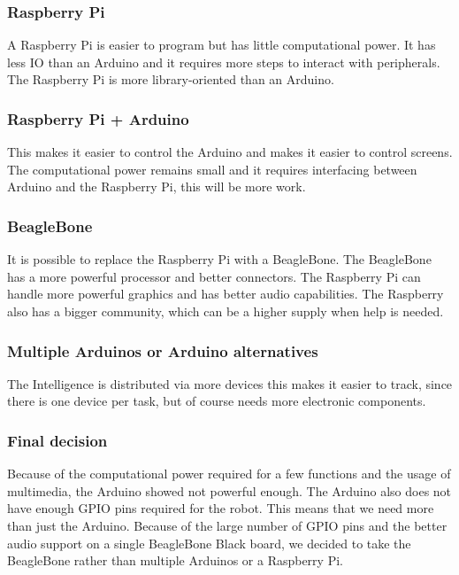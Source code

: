 \documentclass[11pt,twoside,a4paper]{report}
\begin{document}
\subsubsection{Raspberry Pi}
A Raspberry Pi is easier to program but has little computational power. It has less IO than an Arduino and it requires more steps to interact with peripherals. The Raspberry Pi is more library-oriented than an Arduino.
\subsubsection{Raspberry Pi + Arduino}
This makes it easier to control the Arduino and makes it easier to control screens. The computational power remains small and it requires interfacing between Arduino and the Raspberry Pi, this will be more work. 
\subsubsection{BeagleBone}
It is possible to replace the Raspberry Pi with a BeagleBone. The BeagleBone has a more powerful processor and better connectors. The Raspberry Pi can handle more powerful graphics and has better audio capabilities. The Raspberry also has a bigger community, which can be a higher supply when help is needed. 
\subsubsection{Multiple Arduinos or Arduino alternatives}
The Intelligence is distributed via more devices this makes it easier to track, since there is one device per task, but of course needs more electronic components. 
\subsubsection{Final decision}
Because of the computational power required for a few functions and the usage of multimedia, the Arduino showed not powerful enough. The Arduino also does not have enough GPIO pins required for the robot. This means that we need more than just the Arduino. Because of the large number of GPIO pins and the better audio support on a single BeagleBone Black board, we decided to take the BeagleBone rather than multiple Arduinos or a Raspberry Pi.

\newpage
\end{document}
